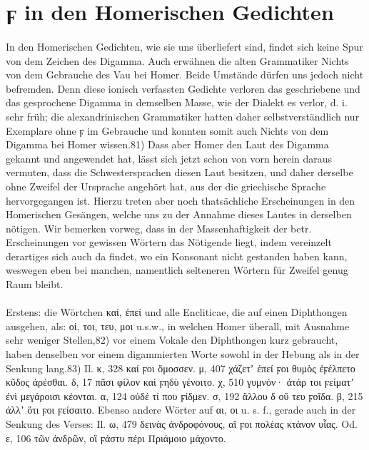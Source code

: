 \section{ϝ in den Homerischen Gedichten}


\paragraph{} In den Homerischen Gedichten, wie sie uns überliefert sind, findet
sich keine Spur von dem Zeichen des Digamma. Auch erwähnen die alten Grammatiker
Nichts von dem Gebrauche des Vau bei Homer. Beide Umstände dürfen uns jedoch
nicht befremden. Denn diese ionisch verfassten Gedichte verloren das
geschriebene und das gesprochene Digamma in demselben Masse, wie der Dialekt es
verlor, d. i. sehr früh; die alexandrinischen Grammatiker hatten daher
selbstverständlich nur Exemplare ohne ϝ im Gebrauche und konnten somit auch
Nichts von dem Digamma bei Homer wissen.81) Dass aber Homer den Laut des Digamma
gekannt und angewendet hat, lässt sich jetzt schon von vorn herein daraus
vermuten, dass die Schwestersprachen diesen Laut besitzen, und daher derselbe
ohne Zweifel der Ursprache angehört hat, aus der die griechische Sprache
hervorgegangen ist. Hierzu treten aber noch thatsächliche Erscheinungen in den
Homerischen Gesängen, welche uns zu der Annahme dieses Lautes in derselben
nötigen. Wir bemerken vorweg, dass in der Massenhaftigkeit der betr.
Erscheinungen vor gewissen Wörtern das Nötigende liegt, indem vereinzelt
derartiges sich auch da findet, wo ein Konsonant nicht gestanden haben kann,
weswegen eben bei manchen, namentlich selteneren Wörtern für Zweifel genug Raum
bleibt. 

\paragraph{}Erstens: die Wörtchen καί, ἐπεί und alle Encliticae, die auf einen
Diphthongen ausgehen, als: οἱ, τοι, τευ, μοι u.s.w., in welchen Homer überall,
mit Ausnahme sehr weniger Stellen,82) vor einem Vokale den Diphthongen kurz
gebraucht, haben denselben vor einem digammierten Worte sowohl in der Hebung als
in der Senkung lang.83) Il. κ, 328 καί ϝοι ὄμοσσεν. μ, 407 χάζετʼ ἐπεί ϝοι θυμὸς
ἐϝέλπετο κῦδος ἀρέσθαι. δ, 17 πᾶσι φίλον καὶ ϝηδὺ γένοιτο. χ, 510 γυμνόν· ἀτάρ
τοι ϝείματʼ ἐνὶ μεγάροισι κέονται. α, 124 οὐδέ τί που ϝίδμεν. σ, 192 ἄλλου δ οὔ
τευ ϝοῖδα. β, 215 ἀλλʼ ὅτι ϝοι ϝείσαιτο. Ebenso andere Wörter auf αι, οι u. s.
f., gerade auch in der Senkung des Verses: Il. ω, 479 δεινὰς ἀνδροφόνους, αἵ ϝοι
πολέας κτάνον υἷας. Od. ε, 106 τῶν ἀνδρῶν, οἳ ϝάστυ πέρι Πριάμοιο μάχοντο.

